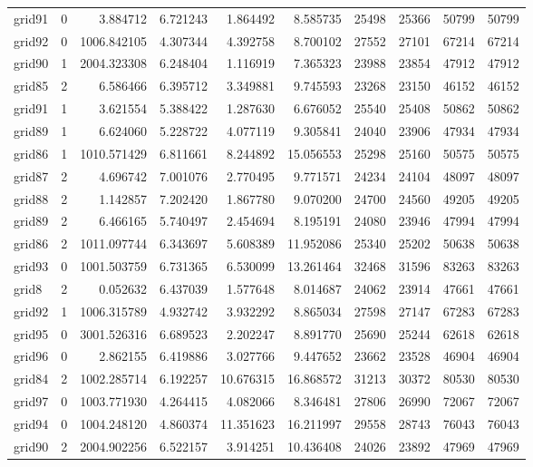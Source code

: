 \begin{longtable}{|l|r|r|r|r|r|r|r|r|r|}
grid91 & 0 & 3.884712 & 6.721243 & 1.864492 & 8.585735 & 25498 & 25366 & 50799 & 50799 \\
grid92 & 0 & 1006.842105 & 4.307344 & 4.392758 & 8.700102 & 27552 & 27101 & 67214 & 67214 \\
grid90 & 1 & 2004.323308 & 6.248404 & 1.116919 & 7.365323 & 23988 & 23854 & 47912 & 47912 \\
grid85 & 2 & 6.586466 & 6.395712 & 3.349881 & 9.745593 & 23268 & 23150 & 46152 & 46152 \\
grid91 & 1 & 3.621554 & 5.388422 & 1.287630 & 6.676052 & 25540 & 25408 & 50862 & 50862 \\
grid89 & 1 & 6.624060 & 5.228722 & 4.077119 & 9.305841 & 24040 & 23906 & 47934 & 47934 \\
grid86 & 1 & 1010.571429 & 6.811661 & 8.244892 & 15.056553 & 25298 & 25160 & 50575 & 50575 \\
grid87 & 2 & 4.696742 & 7.001076 & 2.770495 & 9.771571 & 24234 & 24104 & 48097 & 48097 \\
grid88 & 2 & 1.142857 & 7.202420 & 1.867780 & 9.070200 & 24700 & 24560 & 49205 & 49205 \\
grid89 & 2 & 6.466165 & 5.740497 & 2.454694 & 8.195191 & 24080 & 23946 & 47994 & 47994 \\
grid86 & 2 & 1011.097744 & 6.343697 & 5.608389 & 11.952086 & 25340 & 25202 & 50638 & 50638 \\
grid93 & 0 & 1001.503759 & 6.731365 & 6.530099 & 13.261464 & 32468 & 31596 & 83263 & 83263 \\
grid8 & 2 & 0.052632 & 6.437039 & 1.577648 & 8.014687 & 24062 & 23914 & 47661 & 47661 \\
grid92 & 1 & 1006.315789 & 4.932742 & 3.932292 & 8.865034 & 27598 & 27147 & 67283 & 67283 \\
grid95 & 0 & 3001.526316 & 6.689523 & 2.202247 & 8.891770 & 25690 & 25244 & 62618 & 62618 \\
grid96 & 0 & 2.862155 & 6.419886 & 3.027766 & 9.447652 & 23662 & 23528 & 46904 & 46904 \\
grid84 & 2 & 1002.285714 & 6.192257 & 10.676315 & 16.868572 & 31213 & 30372 & 80530 & 80530 \\
grid97 & 0 & 1003.771930 & 4.264415 & 4.082066 & 8.346481 & 27806 & 26990 & 72067 & 72067 \\
grid94 & 0 & 1004.248120 & 4.860374 & 11.351623 & 16.211997 & 29558 & 28743 & 76043 & 76043 \\
grid90 & 2 & 2004.902256 & 6.522157 & 3.914251 & 10.436408 & 24026 & 23892 & 47969 & 47969 \\

\end{longtable}
